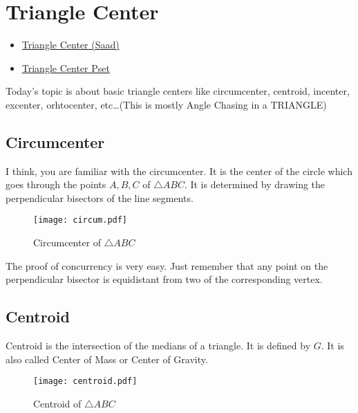 \chapter{Triangle Center}%

\begin{linkb}
   \begin{itemize}
       \item \href{https://www.youtube.com/watch?v=gWAeVwjzndQ}{Triangle Center (Saad)}
        \item \href{https://drive.google.com/file/d/1JISJtfI-zb_jadi_gM5iWcz1ao4Dw4J8/view}{Triangle Center Pset}
   \end{itemize}
\end{linkb}



Today's topic is about basic triangle centers like circumcenter, centroid, incenter, excenter, orhtocenter, etc\ldots (This is mostly Angle Chasing in a TRIANGLE)



\section{Circumcenter}
I think, you are familiar with the circumcenter. It is the center of the circle which goes through the points $A,B,C$ of $\triangle ABC$. It is determined by drawing the perpendicular bisectors of the line segments.

\begin{figure}[ht] 
\centering
	\texttt{[image: circum.pdf]}
\caption{Circumcenter of \(\triangle ABC\)}
\end{figure}
The proof of concurrency is very easy. Just remember that any point on the perpendicular bisector is equidistant from two of the corresponding vertex. 

\section{Centroid}

Centroid is the intersection of the medians of a triangle. It is defined by \(G\). It is also called Center of Mass or Center of Gravity.
\begin{figure}[h]
	\centering
	\texttt{[image: centroid.pdf]}
\caption{Centroid of \(\triangle ABC\)}
\end{figure}


